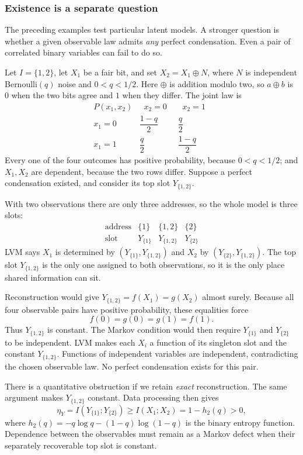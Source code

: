 \documentclass[11pt]{article}
\begin{document}
\subsubsection{Existence is a separate question}
\label{sec:existence}
The preceding examples test particular latent models. A stronger question is
whether a given observable law admits \emph{any} perfect condensation.
Even a pair of correlated binary variables can fail to do so.

Let $I=\{1,2\}$, let $X_1$ be a fair bit, and set $X_2=X_1\mathbin{\oplus}N$,
where $N$ is independent Bernoulli$(q)$ noise and $0<q<1/2$. Here
$\oplus$ is addition modulo two, so $a\oplus b$ is $0$ when the two bits agree
and $1$ when they differ.
The joint law is
\[
\renewcommand{\arraystretch}{1.8}
\begin{array}{r|cc}
 P(x_1,x_2) & \;\;x_2=0\;\; & \;\;x_2=1\;\;\\\hline
 x_1=0 & \dfrac{1-q}{2} & \dfrac{q}{2}\\
 x_1=1 & \dfrac{q}{2} & \dfrac{1-q}{2}
\end{array}
\]
Every one of the four outcomes has positive probability, because $0<q<1/2$;
and $X_1,X_2$ are dependent, because the two rows differ.
Suppose a perfect condensation existed, and consider its top slot
$Y_{\{1,2\}}$.

With two observations there are only three addresses, so the whole model is
three slots:
\[
\begin{array}{r|ccc}
 \text{address} & \{1\} & \{1,2\} & \{2\}\\
 \text{slot} & Y_{\{1\}} & Y_{\{1,2\}} & Y_{\{2\}}
\end{array}
\]
LVM says $X_1$ is determined by $(Y_{\{1\}},Y_{\{1,2\}})$ and $X_2$ by
$(Y_{\{2\}},Y_{\{1,2\}})$. The top slot $Y_{\{1,2\}}$ is the only one assigned to both
observations, so it is the only place shared information can sit.

Reconstruction would give $Y_{\{1,2\}}=f(X_1)=g(X_2)$ almost surely. Because
all four observable pairs have positive probability, these equalities force
\[
 f(0)=g(0)=g(1)=f(1).
\]
Thus $Y_{\{1,2\}}$ is constant. The Markov condition would then require
$Y_{\{1\}}$ and $Y_{\{2\}}$ to be independent. LVM
makes each $X_i$ a function of its singleton slot and the constant $Y_{\{1,2\}}$.
Functions of independent variables are independent, contradicting the chosen
observable law. No perfect condensation exists for this pair.

There is a quantitative obstruction if we retain \emph{exact} reconstruction. The same argument makes $Y_{\{1,2\}}$ constant. Data processing then
gives
\[
 \eta_Y=I(Y_{\{1\}};Y_{\{2\}})
 \ge I(X_1;X_2)=1-h_2(q)>0,
\]
where $h_2(q)=-q\log q-(1-q)\log(1-q)$ is the binary entropy function.
Dependence between the observables must remain as a Markov defect when their
separately recoverable top slot is constant.
\end{document}
